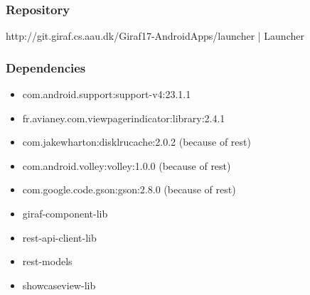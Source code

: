\subsubsection{Repository}
http://git.giraf.cs.aau.dk/Giraf17-AndroidApps/launcher |
Launcher

\subsubsection{Dependencies}
\begin{itemize}
  \item com.android.support:support-v4:23.1.1
  \item fr.avianey.com.viewpagerindicator:library:2.4.1 
  \item com.jakewharton:disklrucache:2.0.2 (because of rest)
  \item com.android.volley:volley:1.0.0 (because of rest)
  \item com.google.code.gson:gson:2.8.0 (because of rest)
  \item giraf-component-lib
  \item rest-api-client-lib
  \item rest-models
  \item showcaseview-lib
\end{itemize}